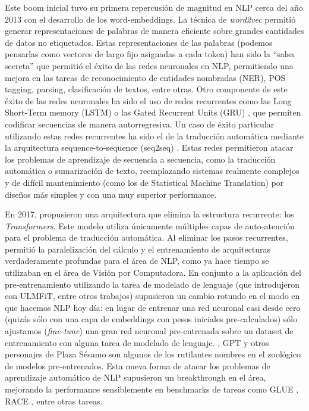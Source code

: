 Este boom inicial tuvo su primera repercusión de magnitud en NLP cerca del año 2013 con el desarrollo de los word-embeddings. La técnica de \emph{word2vec} \cite{mikolov2013distributed} permitió generar representaciones de palabras de manera eficiente sobre grandes cantidades de datos no etiquetados. Estas representaciones de las palabras (podemos pensarlas como vectores de largo fijo asignadas a cada token) han sido la ``salsa secreta'' que permitió el éxito de las redes neuronales en NLP, permitiendo una mejora en las tareas de reconocimiento de entidades nombradas (NER), POS tagging, parsing, clasificación de textos, entre otras. Otro componente de este éxito de las redes neuronales ha sido el uso de redes recurrentes como las Long Short-Term memory (LSTM) \cite{hochreiter1997long} o las Gated Recurrent Units (GRU) \cite{cho-etal-2014-learning}, que permiten codificar secuencias de manera autorregresiva. Un caso de éxito particular utilizando estas redes recurrentes ha sido el de la traducción automática mediante la arquitectura sequence-to-sequence (seq2seq) \cite{sutskever2014sequence}. Estas redes permitieron atacar los problemas de aprendizaje de secuencia a secuencia, como la traducción automática o sumarización de texto, reemplazando sistemas realmente complejos y de difícil mantenimiento (como los de Statistical Machine Translation) por diseños más simples y con una muy superior performance.

En 2017, \citet{vaswani2017attention} propusieron una arquitectura que elimina la estructura recurrente: los \emph{Transformers}. Este modelo utiliza únicamente múltiples capas de auto-atención para el problema de traducción automática. Al eliminar los pasos recurrentes, permitió la paralelización del cálculo y el entrenamiento de arquitecturas verdaderamente profundas para el área de NLP, como ya hace tiempo se utilizaban en el área de Visión por Computadora. En conjunto a la aplicación del pre-entrenamiento utilizando la tarea de modelado de lenguaje (que introdujeron \citet{howard-ruder-2018-universal} con ULMFiT, entre otros trabajos) supusieron un cambio rotundo en el modo en que hacemos NLP hoy día: en lugar de entrenar una red neuronal casi desde cero (quizás sólo con una capa de embeddings con pesos iniciales pre-calculados) sólo ajustamos (\emph{fine-tune}) una gran red neuronal pre-entrenada sobre un dataset de entrenamiento con alguna tarea de modelado de lenguaje. \bert{}, GPT y otros personajes de Plaza Sésamo son algunos de los rutilantes nombres en el zoológico de modelos pre-entrenados. Esta nueva forma de atacar los problemas de aprendizaje automático de NLP supusieron un breakthrough en el área, mejorando la performance sensiblemente en benchmarks de tareas como GLUE \cite{wang-etal-2018-glue}, RACE \cite{lai2017race}, entre otras tareas.

